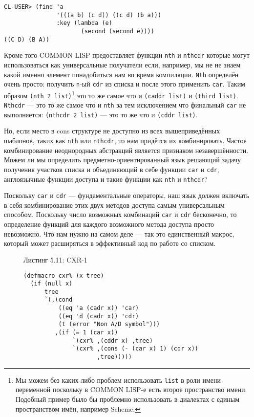 \begin{verbatim}
CL-USER> (find 'a
               '(((a b) (c d)) ((c d) (b a)))
               :key (lambda (e)
                      (second (second e))))
((C D) (B A))
\end{verbatim}

Кроме того COMMON LISP предоставляет функции \verb"nth" и \verb"nthcdr" которые могут использоваться как универсальные получатели если, например, мы не не знаем какой именно элемент понадобиться нам во время компиляции. \verb"Nth" определён очень просто: получить \verb"n"-ый \verb"cdr" из списка и после этого применить \verb"car". Таким образом \verb"(nth 2 list)"\footnote{Мы можем без каких-либо проблем использовать \verb"list" в роли имени переменной поскольку в COMMON LISP-е есть второе пространство имени. Подобный пример было бы проблемно использовать в диалектах с единым пространством имён, например Scheme.} это то же самое что и \verb"(caddr list)" и \verb"(third list)". \verb"Nthcdr" --- это то же самое что и \verb"nth" за тем исключением что финальный \verb"car" не выполняется: \verb"(nthcdr 2 list)" --- это то же что и \verb"(cddr list)".



Но, если место в cons структуре не доступно из всех вышеприведённых шаблонов, таких как \verb"nth" или \verb"nthcdr", то нам придётся их комбинировать. Частое комбинирование неоднородных абстракций является признаком незавершённости. Можем ли мы определить предметно-ориентированный язык решающий задачу получения участков списка и объединяющий в себе функции \verb"car" и \verb"cdr", англоязычные функции доступа и такие функции как \verb"nth" и \verb"nthcdr"?

Поскольку \verb"car" и \verb"cdr" --- фундаментальные операторы, наш язык должен включать в себя комбинирование этих двух методов доступа самым универсальным способом. Поскольку число возможных комбинаций \verb"car" и \verb"cdr" бесконечно, то определение функций для каждого возможного метода доступа просто невозможно. Что нам нужно на самом деле --- так это единственный макрос, который может расширяться в эффективный код по работе со списком.

\begin{figure}Листинг 5.11: CXR-1\label{listing_5.11}
\listbegin
\begin{verbatim}
(defmacro cxr% (x tree)
  (if (null x)
      tree
      `(,(cond
          ((eq 'a (cadr x)) 'car)
          ((eq 'd (cadr x)) 'cdr)
          (t (error "Non A/D symbol")))
         ,(if (= 1 (car x))
              `(cxr% ,(cddr x) ,tree)
              `(cxr% ,(cons (- (car x) 1) (cdr x))
                     ,tree)))))
\end{verbatim}
\listend
\end{figure}

